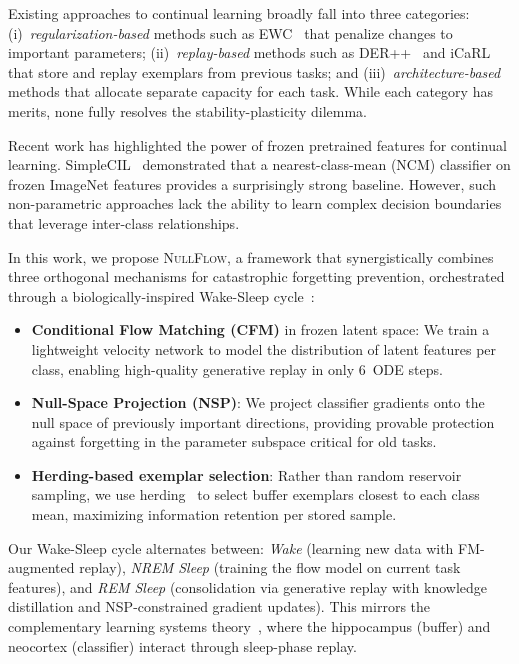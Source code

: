 \documentclass[10pt,twocolumn,letterpaper]{article}
\newcommand{\ours}{\textsc{NullFlow}}
\begin{document}
Existing approaches to continual learning broadly fall into three categories: (i)~\textit{regularization-based} methods such as EWC~\cite{kirkpatrick2017overcoming} that penalize changes to important parameters; (ii)~\textit{replay-based} methods such as DER++~\cite{buzzega2020dark} and iCaRL~\cite{rebuffi2017icarl} that store and replay exemplars from previous tasks; and (iii)~\textit{architecture-based} methods that allocate separate capacity for each task. While each category has merits, none fully resolves the stability-plasticity dilemma.

Recent work has highlighted the power of frozen pretrained features for continual learning. SimpleCIL~\cite{zhou2024revisiting} demonstrated that a nearest-class-mean (NCM) classifier on frozen ImageNet features provides a surprisingly strong baseline. However, such non-parametric approaches lack the ability to learn complex decision boundaries that leverage inter-class relationships.

In this work, we propose \ours{}, a framework that synergistically combines three orthogonal mechanisms for catastrophic forgetting prevention, orchestrated through a biologically-inspired Wake-Sleep cycle~\cite{hinton1995wake}:

\begin{itemize}[leftmargin=*,itemsep=2pt]
  \item \textbf{Conditional Flow Matching (CFM)} in frozen latent space: We train a lightweight velocity network to model the distribution of latent features per class, enabling high-quality generative replay in only 6~ODE steps.
  \item \textbf{Null-Space Projection (NSP)}: We project classifier gradients onto the null space of previously important directions, providing provable protection against forgetting in the parameter subspace critical for old tasks.
  \item \textbf{Herding-based exemplar selection}: Rather than random reservoir sampling, we use herding~\cite{welling2009herding} to select buffer exemplars closest to each class mean, maximizing information retention per stored sample.
\end{itemize}

Our Wake-Sleep cycle alternates between: \textit{Wake} (learning new data with FM-augmented replay), \textit{NREM Sleep} (training the flow model on current task features), and \textit{REM Sleep} (consolidation via generative replay with knowledge distillation and NSP-constrained gradient updates). This mirrors the complementary learning systems theory~\cite{kumaran2016learning}, where the hippocampus (buffer) and neocortex (classifier) interact through sleep-phase replay.
\end{document}
